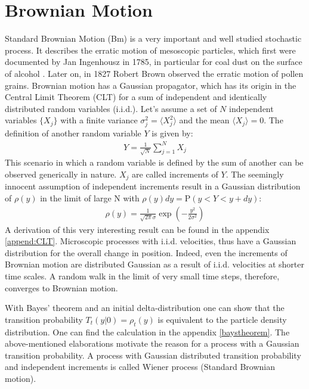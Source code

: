 \documentclass[
  a4paper,BCOR10mm,oneside,
  headsepline,footsepline,%
  fleqn,openbib
]{scrbook}
\begin{document}
\section{Brownian Motion}
Standard Brownian Motion (Bm) is a very important and well studied stochastic process. It describes the erratic motion of mesoscopic particles, which first were documented by Jan Ingenhousz in 1785, in particular for coal dust on the surface of alcohol \cite{Hofling2013}. Later on, in 1827 Robert Brown observed the erratic motion of pollen grains. Brownian motion has a Gaussian propagator, which has its origin in the Central Limit Theorem (CLT) for a sum of independent and identically distributed random variables (i.i.d.). Let's assume a set of $N$ independent variables $\{X_j\}$ with a finite variance $ \sigma_j^2=\langle X_{j}^2\rangle $ and the mean $\langle X_{j}\rangle = 0$. The definition of another random variable $Y$ is given by:
 \begin{align}
  Y = \frac{1}{\sqrt{N}} \sum_{j=1}^N X_j \label{eq:CLT}
 \end{align}
This scenario in which a random variable is defined by the sum of another can be observed generically in nature. $X_j$ are called increments of $Y$. The seemingly innocent assumption of independent increments result in a Gaussian distribution of $\rho(y)$ in the limit of large N with $\rho(y)dy=\mathrm{P}(y<Y<y+dy)$:
\begin{align}
 \rho(y) =\frac{1}{\sqrt{2 \pi} \sigma } \exp \left(-\frac{y^2}{2 \sigma^2}\right)
\end{align}
A derivation of this very interesting result can be found in the appendix \ref{append:CLT}. Microscopic processes with i.i.d. velocities, thus have a Gaussian distribution for the overall change in position. Indeed, even the increments of Brownian motion are distributed Gaussian as a result of i.i.d. velocities at shorter time scales. A random walk in the limit of very small time steps, therefore, converges to Brownian motion. \par With  Bayes' theorem and an initial delta-distribution one can show that the transition probability $T_{t}(y|0) = \rho_{t}(y)$ is equivalent to the particle density distribution. One can find the calculation in the appendix \ref{baystheorem}. The above-mentioned elaborations motivate the reason for a process with a Gaussian transition probability. A process with Gaussian distributed transition probability and independent increments is called Wiener process (Standard Brownian motion).\par
\end{document}
